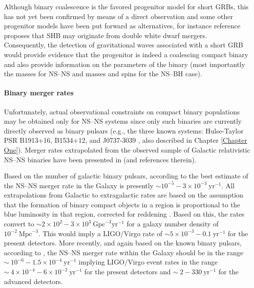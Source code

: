 Although binary coalescence is the favored progenitor model for short GRBs, this has not yet been confirmed by means of a direct observation and some other progenitor models have been put forward as alternatives, for instance reference  \cite{MNR:MNR12923} proposes that SHB may originate from double white dwarf mergers. Consequently, the detection of gravitational waves associated with a short GRB would provide evidence that the progenitor is indeed a coalescing compact binary and also provide information on the parameters of the binary (most importantly the masses for NS--NS and masses and spins for the NS--BH case).

\paragraph{Binary merger rates}
\label{shbrates}
Unfortunately, actual observational constraints on compact binary populations may be obtained only for NS--NS systems since only such binaries are currently directly observed as binary pulsars (e.g., the three known systems: Hulse-Taylor PSR B1913+16, B1534+12, and J0737-3039 \cite{Kim:2006fm}, also described in Chapter \ref{Chapter One}). Merger rates extrapolated from the observed sample of Galactic relativistic NS--NS binaries have been presented in \cite{Nutzman:2004bw,Kim:2006fm} (and references therein). 

Based on the number of galactic binary pulsars, according to \cite{Nutzman:2004bw} the best estimate of the NS--NS merger rate in the Galaxy is presently $\sim 10^{-5}-3 \times 10^{-3}~\mathrm{yr}^{-1}$. All extrapolations from Galactic to extragalactic rates are based on the assumption that the formation of binary compact objects in a region is proportional to the blue luminosity in that region, corrected for reddening \cite{Phinney:1991ei}. Based on this, the rates convert to $\sim 2 \times 10^2-3 \times 10^3~\mathrm{Gpc}^{-3}\mathrm{yr}^{-1}$ for a galaxy number density of $10^{-2}~\mathrm {Mpc}^{-3}$. This would imply a LIGO/Virgo rate of $\sim 5 \times 10^{-3}-0.1  ~\mathrm{yr}^{-1}$ for the present detectors. More recently, and again based on the known binary pulsars, according to \cite{Kim:2006fm}, the NS--NS merger rate within the Galaxy should be in the range $\sim ~10^{-6}-1.5 \times 10^{-4} ~\mathrm{yr}^{-1}$ implying LIGO/Virgo event rates in the range $\sim ~4 \times 10^{-4}-6 \times 10^{-2} ~\mathrm{yr}^{-1}$ for the present detectors and $\sim ~2-330 ~\mathrm{yr}^{-1}$ for the advanced detectors.

